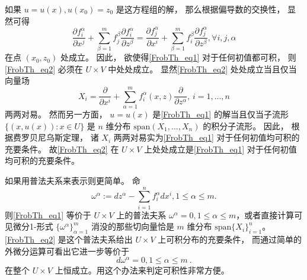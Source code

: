 如果 $u=u(x),u(x_0)=z_0$ 是这方程组的解， 那么根据偏导数的交换性， 显然可得
\begin{equation}\label{FrobTh_eq2}
\frac{\partial f_i^\alpha}{\partial x^j}+\sum_{\beta=1}^mf_j^\beta\frac{\partial f_i^\alpha}{\partial z^\beta}
=\frac{\partial f_j^\alpha}{\partial x^i}+\sum_{\beta=1}^mf_i^\beta\frac{\partial f_j^\alpha}{\partial z^\beta},\forall i,j,\alpha
\end{equation}
在点 $(x_0,z_0)$ 处成立。 因此， 欲使得\autoref{FrobTh_eq1} 对于任何初值都可积， 则\autoref{FrobTh_eq2} 必须在 $U\times V$ 中处处成立。 显然\autoref{FrobTh_eq2} 处处成立当且仅当向量场
$$
X_i=\frac{\partial}{\partial x^i}+\sum_{\alpha=1}^mf_i^\alpha(x,z)\frac{\partial}{\partial z^\alpha},\,i=1,...,n
$$
两两对易。 然而另一方面， $u=u(x)$ 是\autoref{FrobTh_eq1} 的解当且仅当子流形 $\{(x,u(x)):x\in U\}$ 是 $n$ 维分布 $\text{span}(X_1,...,X_n)$ 的积分子流形。 因此， 根据费罗贝尼乌斯定理， 诸 $X_i$ 两两对易实为\autoref{FrobTh_eq1} 对于任何初值均可积的充要条件。 故\autoref{FrobTh_eq2} 在 $U\times V$ 上处处成立是\autoref{FrobTh_eq1} 对于任何初值均可积的充要条件。

如果用普法夫系来表示则更简单。 命
\begin{equation}\label{FrobTh_eq3}
\omega^\alpha:=dz^\alpha-\sum_{i=1}^nf_i^\alpha dx^i,1\leq\alpha\leq m.
\end{equation}
则\autoref{FrobTh_eq1} 等价于 $U\times V$ 上的普法夫系 $\omega^\alpha=0,1\leq\alpha\leq m$，或者直接计算可见微分1-形式 $\{\omega^\alpha\}_{\alpha=1}^m$ 消没的那些切向量恰是 $m$ 维分布 $\text{span}\{X_i\}_{i=1}^n$。 \autoref{FrobTh_eq2} 是这个普法夫系给出 $U\times V$ 上可积分布的充要条件， 而通过简单的外微分运算可看出它进一步等价于
$$
d\omega^\alpha=0,1\leq\alpha\leq m~.
$$
在整个 $U\times V$ 上恒成立。用这个办法来判定可积性非常方便。